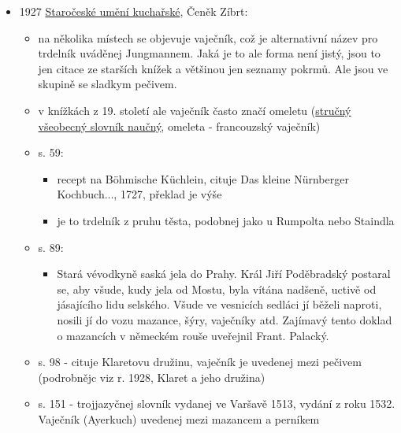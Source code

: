 \begin{itemize}
  \begin{itemize}
  \tightlist
  \item
    týdenník pro politiku, poučení a zábavu
  \item
    52(30b), s. 6.
  \item
    V Kansasu 19. dubna 1927
  \item
    dopis od paní z Kansasu, zve pana pořadatele na trdelníky, pokud je
    má rád. Má.
  \end{itemize}
\item
  1927
  \href{https://ndk.cz/uuid/uuid:b59a1ff0-9f23-11ea-b6e0-005056827e51}{Staročeské
  umění kuchařské}, Čeněk Zíbrt:

  \begin{itemize}
  \tightlist
  \item
    na několika místech se objevuje vaječník, což je alternativní název
    pro trdelník uváděnej Jungmannem. Jaká je to ale forma není jistý,
    jsou to jen citace ze starších knížek a většinou jen seznamy pokrmů.
    Ale jsou ve skupině se sladkym pečivem.
  \item
    v knížkách z 19. století ale vaječník často značí omeletu
    (\href{https://ndk.cz/uuid/uuid:f7e03900-d300-11dc-9815-000d606f5dc6}{stručný
    všeobecný slovník naučný}, omeleta - francouzský vaječník)
  \item
    s. 59:

    \begin{itemize}
    \tightlist
    \item
      recept na Böhmische Küchlein, cituje Das kleine Nürnberger
      Kochbuch..., 1727, překlad je výše
    \item
      je to trdelník z pruhu těsta, podobnej jako u Rumpolta nebo
      Staindla
    \end{itemize}
  \item
    s. 89:

    \begin{itemize}
    \tightlist
    \item
      Stará vévodkyně saská jela do Prahy. Král Jiří Poděbradský
      postaral se, aby všude, kudy jela od Mostu, byla vítána nadšeně,
      uctivě od jásajícího lidu selského. Všude ve vesnicích sedláci jí
      běželi naproti, nosili jí do vozu mazance, šýry, vaječníky atd.
      Zajímavý tento doklad o mazancích v německém rouše uveřejnil
      Frant. Palacký.
    \end{itemize}
  \item
    s. 98 - cituje Klaretovu družinu, vaječník je uvedenej mezi pečivem
    (podrobnějc viz r. 1928, Klaret a jeho družina)
  \item
    s. 151 - trojjazyčnej slovník vydanej ve Varšavě 1513, vydání z roku
    1532. Vaječník (Ayerkuch) uvedenej mezi mazancem a perníkem


\end{itemize}
\end{itemize}
